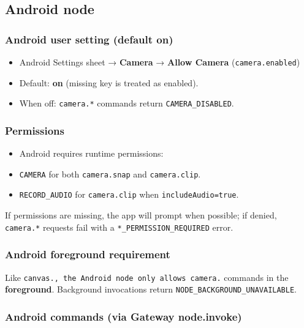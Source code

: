 \subsection{Android node}


\subsubsection{Android user setting (default on)}


\begin{itemize}
  \item Android Settings sheet → \textbf{Camera} → \textbf{Allow Camera} (\texttt{camera.enabled})
  \item Default: \textbf{on} (missing key is treated as enabled).
  \item When off: \texttt{camera.*} commands return \texttt{CAMERA\_DISABLED}.
\end{itemize}


\subsubsection{Permissions}


\begin{itemize}
  \item Android requires runtime permissions:
  \item \texttt{CAMERA} for both \texttt{camera.snap} and \texttt{camera.clip}.
  \item \texttt{RECORD\_AUDIO} for \texttt{camera.clip} when \texttt{includeAudio=true}.
\end{itemize}


If permissions are missing, the app will prompt when possible; if denied, \texttt{camera.*} requests fail with a
\texttt{*\_PERMISSION\_REQUIRED} error.

\subsubsection{Android foreground requirement}


Like \texttt{canvas.\textit{}, the Android node only allows \texttt{camera.}} commands in the \textbf{foreground}. Background invocations return \texttt{NODE\_BACKGROUND\_UNAVAILABLE}.

\subsubsection{Android commands (via Gateway node.invoke)}


